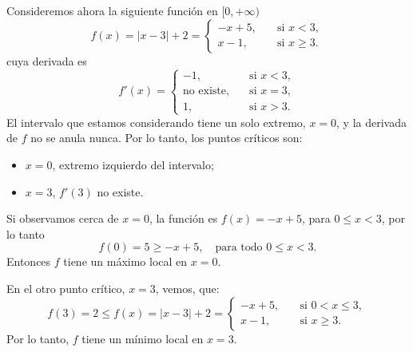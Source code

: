 \begin{example}
    Consideremos ahora la siguiente función en $[0,+\infty)$
    \[ 
    f(x)=|x-3|+2=\begin{cases}
        -x+5,\quad&\text{si $x<3$},
        \\
        x-1,\quad&\text{si $x\ge 3$}.
    \end{cases}
    \]
    cuya derivada es 
    \[ 
    f'(x)=\begin{cases}
        -1,\quad&\text{si $x<3$},
        \\
        \text{no existe},\quad&\text{si $x=3$},
        \\
        1,\quad&\text{si $x> 3$}.
    \end{cases}
    \]
    El intervalo que estamos considerando tiene un solo extremo, $x=0$, y la derivada de $f$ no se anula nunca. Por lo tanto, los puntos críticos son:
    \begin{itemize}
        \item $x=0$, extremo izquierdo del intervalo;
        \item $x=3$, $f'(3)$ no existe.
    \end{itemize}
    Si observamos cerca de $x=0$, la función es $f(x)=-x+5$, para $0\le x<3$, por lo tanto
    \[f(0)= 5 \ge -x+5, \quad\text{para todo $0\le x < 3$}.\]
    Entonces $f$ tiene un máximo local en $x=0$.

    En el otro punto crítico, $x=3$, vemos, que:
    \[
    f(3)=2\le f(x)=|x-3|+2=\begin{cases}
        -x+5,\quad&\text{si $0<x\le 3$},
        \\
        x-1,\quad&\text{si $x\ge 3$}.
    \end{cases}
    \]
    Por lo tanto, $f$ tiene un mínimo local en $x=3$.
\end{example}

